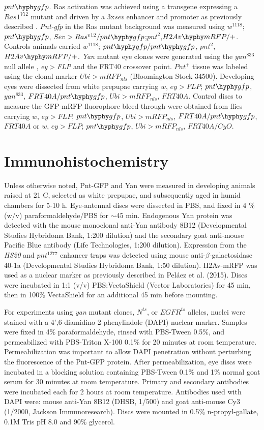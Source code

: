 $pnt\hyphy gfp$. Ras activation was achieved using a transgene expressing a $Ras1^{V12}$ mutant and driven by a 3x\textit{sev} enhancer and promoter \cite{Fortini1992} as previously described \cite{Pelaez2015a}. \textit{Pnt-gfp} in the Ras mutant background was measured using $w^{1118}$; $pnt\hyphy gfp$, $Sev>Ras^{v12}/pnt\hyphy gfp$;$pnt^2$,$H2Av\hyphy mRFP/+$. Controls animals carried $w^{1118}$; $pnt\hyphy gfp/pnt\hyphy gfp$, $pnt^2$, $H2Av\hyphy mRFP/+$. \textit{Yan} mutant eye clones were generated using the $yan^{833}$ null allele \cite{Webber2013}, \textit{ey$>$FLP} and the FRT40 crossover point. $Pnt^+$ tissue was labeled using the clonal marker $Ubi>mRFP_{nls}$ (Bloomington Stock 34500). Developing eyes were dissected from white prepupae carrying $w$, $ey>FLP$; $pnt\hyphy gfp$, $yan^{833}$, $FRT40A/pnt\hyphy gfp$, $Ubi>mRFP_{nls}$, $FRT40A$. Control discs to measure the GFP-mRFP fluorophore bleed-through were obtained from flies carrying $w$, $ey>FLP$; $pnt\hyphy gfp$, $Ubi>mRFP_{nls}$, $FRT40A/pnt\hyphy gfp$, $FRT40A$ or $w$, $ey>FLP$; $pnt\hyphy gfp$, $Ubi>mRFP_{nls}$, $FRT40A/CyO$.

\section{Immunohistochemistry}
\label{appendix:methods:ratio:immunohistochemistry}

Unless otherwise noted, Pnt-GFP and Yan were measured in developing animals raised at 21 \textdegree{} C, selected as white prepupae, and subsequently aged in humid chambers for 5-10 h. Eye-antennal discs were dissected in PBS, and fixed in 4 \% (w/v) paraformaldehyde/PBS for $\sim$45 min. Endogenous Yan protein was detected with the mouse monoclonal anti-Yan antibody 8B12 (Developmental Studies Hybridoma Bank, 1:200 dilution) and the secondary goat anti-mouse Pacific Blue antibody (Life Technologies, 1:200 dilution). Expression from the \textit{HS20} and $pnt^{1277}$ enhancer traps was detected using mouse anti-$\beta$-galactosidase 40-1a (Developmental Studies Hybridoma Bank, 1:50 dilution). H2Av-mRFP was used as a nuclear marker as previously described in Pel\'{a}ez et al. (2015). Discs were incubated in 1:1 (v/v) PBS:VectaShield (Vector Laboratories) for 45 min, then in 100\% VectaShield for an additional 45 min before mounting.

For experiments using \textit{yan} mutant clones, $N^{ts}$, or $EGFR^{ts}$ alleles, nuclei were stained with a 4',6-diamidino-2-phenylindole (DAPI) nuclear marker. Samples were fixed in 4\% paraformaldehyde, rinsed with PBS-Tween 0.5\%, and permeabilized with PBS-Triton X-100 0.1\% for 20 minutes at room temperature. Permeabilization was important to allow DAPI penetration without perturbing the fluorescence of the Pnt-GFP protein. After permeabilization, eye discs were incubated in a blocking solution containing PBS-Tween 0.1\% and 1\% normal goat serum for 30 minutes at room temperature. Primary and secondary antibodies were incubated each for 2 hours at room temperature. Antibodies used with DAPI were: mouse anti-Yan 8B12 (DHSB, 1/500) and goat anti-mouse Cy3 (1/2000, Jackson Immunoresearch). Discs were mounted in 0.5\% n-propyl-gallate, 0.1M Tris pH 8.0 and 90\% glycerol.

